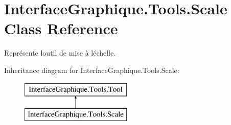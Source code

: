 \hypertarget{class_interface_graphique_1_1_tools_1_1_scale}{}\section{Interface\+Graphique.\+Tools.\+Scale Class Reference}
\label{class_interface_graphique_1_1_tools_1_1_scale}


Représente l\textquotesingle{}outil de mise à l\textquotesingle{}échelle.  


Inheritance diagram for Interface\+Graphique.\+Tools.\+Scale\+:\begin{figure}[H]
\begin{center}
\leavevmode
\includegraphics[height=2.000000cm]{class_interface_graphique_1_1_tools_1_1_scale}
\end{center}
\end{figure}

